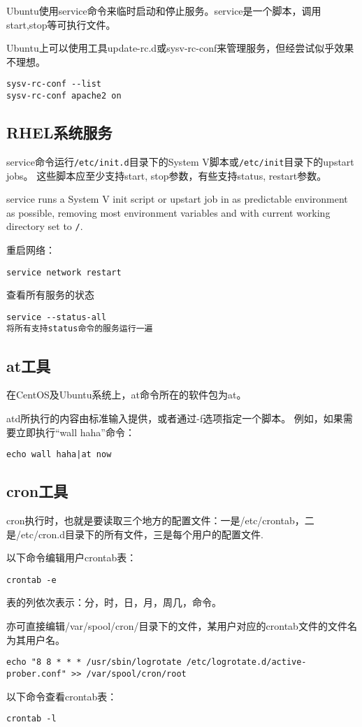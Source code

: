 Ubuntu使用service命令来临时启动和停止服务。service是一个脚本，调用start,stop等可执行文件。

Ubuntu上可以使用工具update-rc.d或sysv-rc-conf来管理服务，但经尝试似乎效果不理想。

\begin{verbatim}
sysv-rc-conf --list 
sysv-rc-conf apache2 on
\end{verbatim}

\subsection{RHEL系统服务}
service命令运行\verb+/etc/init.d+目录下的System V脚本或\verb+/etc/init+目录下的upstart jobs。
这些脚本应至少支持start, stop参数，有些支持status, restart参数。

service runs a System V init script or upstart job in as predictable environment as possible, removing most environment variables and with current working directory set to \verb+/+.  

重启网络：
\begin{verbatim}
service network restart
\end{verbatim}

查看所有服务的状态
\begin{verbatim}
service --status-all
将所有支持status命令的服务运行一遍
\end{verbatim}


\subsection{at工具}
在CentOS及Ubuntu系统上，at命令所在的软件包为at。

atd所执行的内容由标准输入提供，或者通过-f选项指定一个脚本。
例如，如果需要立即执行“wall haha”命令：

\begin{verbatim}
echo wall haha|at now
\end{verbatim}

\subsection{cron工具}

cron执行时，也就是要读取三个地方的配置文件：一是/etc/crontab，二是/etc/cron.d目录下的所有文件，三是每个用户的配置文件. 


以下命令编辑用户crontab表：
\begin{verbatim}
crontab -e
\end{verbatim}

表的列依次表示：分，时，日，月，周几，命令。

亦可直接编辑/var/spool/cron/目录下的文件，某用户对应的crontab文件的文件名为其用户名。
\begin{verbatim}
echo "8 8 * * * /usr/sbin/logrotate /etc/logrotate.d/active-prober.conf" >> /var/spool/cron/root
\end{verbatim}

以下命令查看crontab表：
\begin{verbatim}
crontab -l
\end{verbatim}
